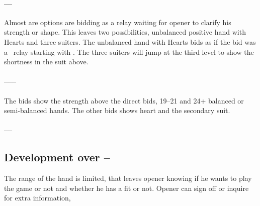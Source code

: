 \paragraph{\bid{1\CS}–\bid{1\DS}–\bid{1\HS}}
Almost are options are bidding \bid{1\SpS} as a relay waiting for opener to clarify his strength or shape. This leaves two possibilities, unbalanced positive hand with Hearts and three suiters. The unbalanced hand with Hearts bids as if the \bid{1\HS} bid was a \lambdaRelay\ relay starting with \bid{2\CS}. The three suiters will jump at the third level to show the shortness in the suit above. 
\paragraph{\bid{1\CS}–\bid{1\DS}–\bid{1\HS}–\bid{1\SpS}}
The bids  show the strength above the direct bids, 19–21 and 24+ balanced or semi-balanced hands. The other bids shows heart and the secondary suit.
\paragraph{\bid{1\CS}–\bid{1\DS}–\bid{1\SpS}}
\subsection{Development over \bid{1\CS}–\bid{1\NT}}
The range of the hand is limited, that leaves opener knowing if he wants to play the game or not and whether he has a fit or not. Opener can sign off or inquire for extra information,
